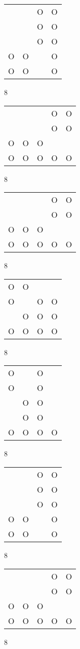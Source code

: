 \begin{tabular}{|m{0.2cm}m{0.2cm}m{0.2cm}m{0.2cm}|}\hline
 & &O&O\\
 & &O&O\\
 & &O&O\\
O&O& &O\\
O&O& &O\\
\hline\end{tabular}8
\begin{tabular}{|m{0.2cm}m{0.2cm}m{0.2cm}m{0.2cm}m{0.2cm}|}\hline
 & & &O&O\\
 & & &O&O\\
O&O&O& & \\
O&O&O&O&O\\
\hline\end{tabular}8
\begin{tabular}{|m{0.2cm}m{0.2cm}m{0.2cm}m{0.2cm}m{0.2cm}|}\hline
 & & &O&O\\
 & & &O&O\\
O&O&O& & \\
O&O&O&O&O\\
\hline\end{tabular}8
\begin{tabular}{|m{0.2cm}m{0.2cm}m{0.2cm}m{0.2cm}|}\hline
O&O& & \\
O& &O&O\\
 &O&O&O\\
O&O&O&O\\
\hline\end{tabular}8
\begin{tabular}{|m{0.2cm}m{0.2cm}m{0.2cm}m{0.2cm}|}\hline
O& &O& \\
O& &O& \\
 &O&O& \\
 &O&O& \\
O&O&O&O\\
\hline\end{tabular}8
\begin{tabular}{|m{0.2cm}m{0.2cm}m{0.2cm}m{0.2cm}|}\hline
 & &O&O\\
 & &O&O\\
 & &O&O\\
O&O& &O\\
O&O& &O\\
\hline\end{tabular}8
\begin{tabular}{|m{0.2cm}m{0.2cm}m{0.2cm}m{0.2cm}m{0.2cm}|}\hline
 & & &O&O\\
 & & &O&O\\
O&O&O& & \\
O&O&O&O&O\\
\hline\end{tabular}8
